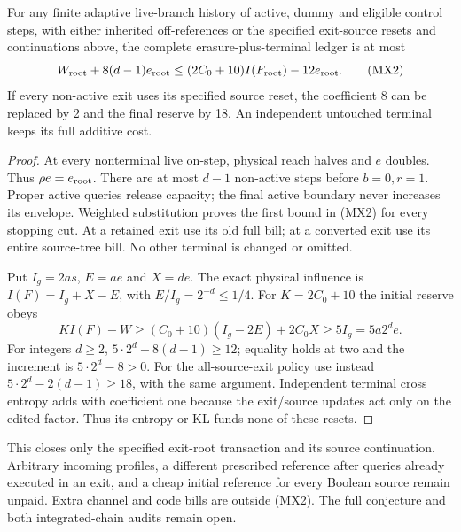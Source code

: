 \begin{theorem}
For any finite adaptive live-branch history of active, dummy and
eligible control steps, with either inherited off-references or
the specified exit-source resets and continuations above, the
complete erasure-plus-terminal ledger is at most
\[
 W_{\rm root}+8(d-1)e_{\rm root}
 \le (2C_0+10)I(F_{\rm root})-12e_{\rm root}.
 \tag{MX2}
\]
If every non-active exit uses its specified source reset, the
coefficient 8 can be replaced by 2 and the final reserve by 18.
An independent untouched terminal keeps its full additive cost.
\end{theorem}
\begin{proof}
At every nonterminal live on-step, physical reach halves and
$e$ doubles. Thus $\rho e=e_{\rm root}$. There are at most
$d-1$ non-active steps before $b=0,r=1$. Proper active queries
release capacity; the final active boundary never increases its
envelope. Weighted substitution proves the first bound in (MX2)
for every stopping cut. At a retained exit use its old full bill;
at a converted exit use its entire source-tree bill. No other
terminal is changed or omitted.

Put $I_g=2as$, $E=ae$ and $X=de$. The exact physical influence
is $I(F)=I_g+X-E$, with $E/I_g=2^{-d}\le1/4$. For
$K=2C_0+10$ the initial reserve obeys
\[
 KI(F)-W\ge(C_0+10)(I_g-2E)+2C_0X\ge5I_g
              =5a2^d e.
\]
For integers $d\ge2$, $5\cdot2^d-8(d-1)\ge12$; equality
holds at two and the increment is $5\cdot2^d-8>0$.
For the all-source-exit policy use instead
$5\cdot2^d-2(d-1)\ge18$, with the same argument.
Independent terminal cross entropy adds with coefficient one
because the exit/source updates act only on the edited factor.
Thus its entropy or KL funds none of these resets.
\end{proof}

This closes only the specified exit-root transaction and its
source continuation. Arbitrary incoming profiles, a different
prescribed reference after queries already executed in an exit,
and a cheap initial reference for every Boolean source remain
unpaid. Extra channel and code bills are outside (MX2).
The full conjecture and both integrated-chain audits remain open.
